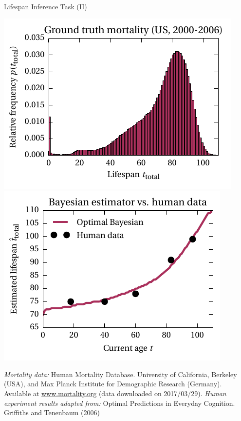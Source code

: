 \documentclass[aspectratio=169]{beamer}
\begin{document}
\begin{frame}{Lifespan Inference Task (II)}

{\centering
\includegraphics[scale=0.85]{media/mortality_ground_truth.pdf}
\includegraphics[scale=0.85]{media/mortality_optimal_bayesian_estimator.pdf}}

{\color{gray}\tiny \emph{Mortality data:} Human Mortality Database. University of California, Berkeley (USA), and Max Planck Institute for Demographic Research (Germany). Available at \url{www.mortality.org} (data downloaded on 2017/03/29). \emph{Human experiment results adapted from:} Optimal Predictions in Everyday Cognition. Griffiths and Tenenbaum (2006)}
\end{frame}
\end{document}
